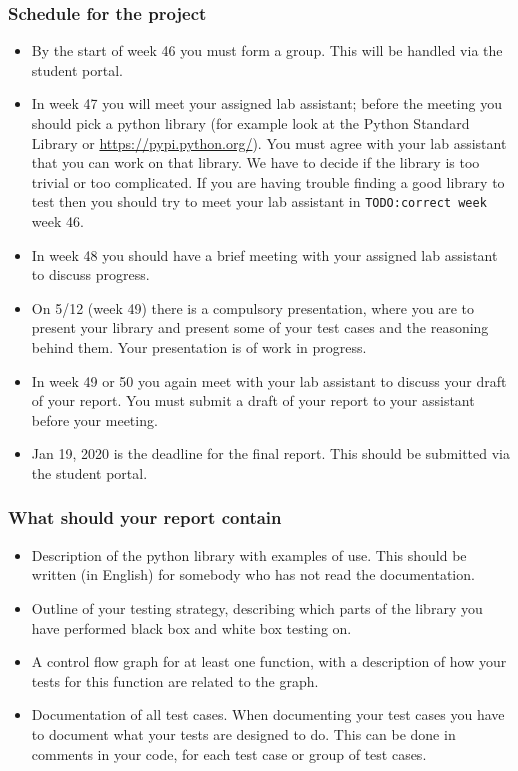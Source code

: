 \documentclass[a4paper]{article}
\newcommand{\todo}[1]{{\tt TODO:#1}}
\begin{document}
\subsubsection*{Schedule for the project}
  \begin{itemize}
  \item By the start of  week 46 you must form a
    group. This will be handled via the student portal.
  \item In week 47 you will meet your assigned lab assistant; before
    the meeting you should pick a python library (for example look at
    the Python Standard Library or
    \url{https://pypi.python.org/}). You must agree with your lab
    assistant that you can work on that library. We have to decide if
    the library is too trivial or too complicated. If you are having
    trouble finding a good library to test then you should try to meet
    your lab assistant in \todo{correct week} week 46.
  \item In week  48 you should have a brief meeting with your assigned lab
    assistant to discuss progress.

  \item On 5/12 (week 49) there is a compulsory presentation, where
    you are to present your library and present some of your test
    cases and the reasoning behind them. Your presentation is of work
    in progress.
    \item In  week 49 or 50 you again meet with your lab assistant to
      discuss your draft of your  report. You must submit a draft of
      your report to your assistant before your meeting.
    \item Jan 19,  2020 is  the deadline for the final
      report. This should be submitted via the student portal.

\end{itemize}



  \subsubsection*{What should your report contain}
  \begin{itemize}
  \item Description of the python library with examples of use. 
  This should be written (in English) for somebody who has not read the documentation.
  \item Outline of your testing strategy, describing which parts of the library 
    you have performed black box and white box testing on.
  \item A control flow graph for at least one function, with a description of 
    how your tests for this function are related to the graph.
  \item Documentation of all test cases.  When documenting your test cases
    you have to document what your tests are designed to do. This can be done
    in comments in your code, for each test case or group of test cases.
  \end{itemize}
\end{document}
